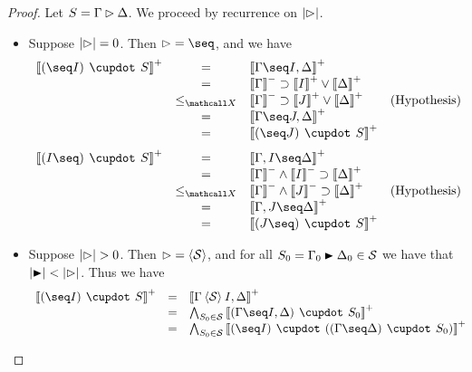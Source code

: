 \begin{proof}
  Let $S = \Gamma \J \Delta$. We proceed by recurrence on $\bradepth{\J}$.
  \begin{itemize}
    \item[\bcase] Suppose $\bradepth{\J} = 0$. Then $\J = {\seq}$,
    and we have
    $$
    \begin{array}{rcll}
      \psint{(\seq I) \mix S}
      &=& \psint{\Gamma \seq I, \Delta} &\\
      &=& \nsint{\Gamma} \limp \psint{I} \lor \psint{\Delta} &\\
      &\sementX& \nsint{\Gamma} \limp \psint{J} \lor \psint{\Delta} &\text{(Hypothesis)}\\
      &=& \psint{\Gamma \seq J, \Delta} &\\
      &=& \psint{(\seq J) \mix S} &
    \end{array}
    $$
    $$
    \begin{array}{rcll}
      \psint{(I \seq) \mix S}
      &=& \psint{\Gamma, I \seq \Delta} &\\
      &=& \nsint{\Gamma} \land \nsint{I} \limp \psint{\Delta} &\\
      &\sementX& \nsint{\Gamma} \land \nsint{J} \limp \psint{\Delta} &\text{(Hypothesis)} \\
      &=& \psint{\Gamma, J \seq \Delta} &\\
      &=& \psint{(J \seq) \mix S} &
    \end{array}
    $$
    \item[\rcase] Suppose $\bradepth{\J} > 0$. Then $\J =
    {\piq{\cS}}$, and for all $S_0 = \Gamma_0 \JB \Delta_0 \in
    \cS$ we have that $\bradepth{\JB} < \bradepth{\J}$. Thus we have
    $$
    \begin{array}{rcll}
      \psint{(\seq I) \mix S}
      &=& \psint{\Gamma \piq{\cS} I, \Delta} & \\
      &=& \bigwedge_{S_0 \in \cS}{\psint{(\Gamma \seq I, \Delta) \mix S_0}} & \\
      &=& \bigwedge_{S_0 \in \cS}{\psint{(\seq I) \mix ((\Gamma \seq \Delta) \mix S_0)}} & \\

\end{array}$$
\end{itemize}
\end{proof}
